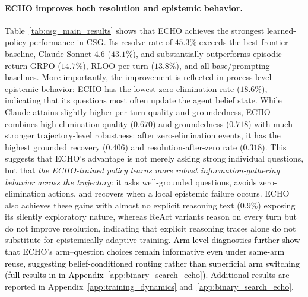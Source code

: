 \documentclass[11pt]{article}
\newcommand{\an}[1]{\textcolor{black}{#1}}
\theoremstyle{plain}
\theoremstyle{definition}
\theoremstyle{remark}
\begin{document}
\paragraph{ECHO improves both resolution and epistemic behavior.}
Table~\ref{tab:csg_main_results} shows that \textsc{ECHO} achieves the strongest learned-policy performance in CSG. Its resolve rate of \(45.3\%\) exceeds the best frontier baseline, Claude Sonnet 4.6 (\(43.1\%\)), and substantially outperforms episodic-return GRPO (\(14.7\%\)), RLOO per-turn (\(13.8\%\)), and all base/prompting baselines. More importantly, the improvement is reflected in process-level epistemic behavior: \textsc{ECHO} has the lowest zero-elimination rate (\(18.6\%\)), indicating that its questions most often update the agent belief state. While Claude attains slightly higher per-turn quality and groundedness, \textsc{ECHO} combines high elimination quality (\(0.670\)) and groundedness (\(0.718\)) with much stronger trajectory-level robustness: after zero-elimination events, it has the highest grounded recovery (\(0.406\)) and resolution-after-zero rate (\(0.318\)). This suggests that \textsc{ECHO}'s advantage is not merely asking strong individual questions, but that \textit{the \textsc{ECHO}-trained policy learns more robust information-gathering behavior across the trajectory}: it asks well-grounded questions, avoids zero-elimination actions, and recovers when a local epistemic failure occurs. \textsc{ECHO} also achieves these gains with almost no explicit reasoning text (\(0.9\%\)) exposing its silently exploratory nature, whereas ReAct variants reason on every turn but do not improve resolution, indicating that explicit reasoning traces alone do not substitute for epistemically adaptive training. \an{Arm-level diagnostics further show that 
\textsc{ECHO}'s arm--question choices remain informative even under same-arm reuse, suggesting belief-conditioned routing rather than superficial arm switching (full results in \Cref{tab:arm_routing_belief_diagnostics} in Appendix~\ref{app:binary_search_echo}).}
Additional results are reported in Appendix~\ref{app:training_dynamics} and~\ref{app:binary_search_echo}. 

\vspace*{-3mm}
\end{document}
